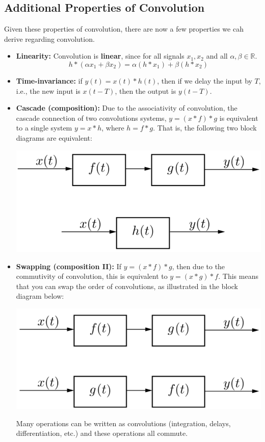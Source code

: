 \documentclass[10pt]{article}
\begin{document}
\subsection*{Additional Properties of Convolution}
Given these properties of convolution, there are now a few properties we cah derive regarding convolution.
\begin{itemize}
    \item \textbf{Linearity:} Convolution is \textbf{linear}, since for all signals $x_1, x_2$ and all $\alpha, \beta \in \mathbb{R}$.
    \[h * (\alpha x_1 + \beta x_2) = \alpha(h * x_1) + \beta(h * x_2)\]
    \item \textbf{Time-invariance:} if $y(t) = x(t) * h(t)$, then if we delay the input by $T$, i.e., the new input is $x(t - T)$, then the output is $y(t - T)$.
    \item \textbf{Cascade (composition):} Due to the associativity of convolution, the cascade connection of two convolutions systems, $y = (x * f) * g$ is equivalent to a single system $y = x * h$, where $h = f * g$.  That is, the following two block diagrams are equivalent:
    \begin{center}
        \includegraphics[scale=0.7]{W4_1.png}
    \end{center}
    \item \textbf{Swapping (composition II):} If $y = (x * f) * g$, then due to the commutivity of convolution, this is equivalent to $y = (x * g) * f$.  This means that you can swap the order of convolutions, as illustrated in the block diagram below:
    \begin{center}
        \includegraphics[scale=0.7]{W4_2.png}
    \end{center}
    Many operations can be written as convolutions (integration, delays, differentiation, etc.) and these operations all commute.
\end{itemize}
\end{document}
